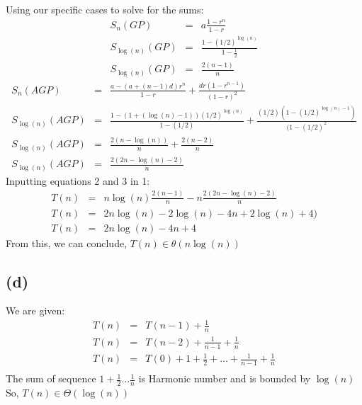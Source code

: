 \documentclass[a4paper,12pt]{article} %
\begin{document}
Using our specific cases to solve for the sums:
\begin{eqnarray}
    S_n(GP) &=& a\frac{1-r^n}{1-r}\nonumber \\
    S_{\log(n)}(GP) &=& \frac{1- (1/2)^{\log(n)}}{1-\frac{1}{2}} \nonumber \\
    S_{\log(n)}(GP) &=& \frac{2(n-1)}{n}
\end{eqnarray}
\begin{eqnarray}
    S_n(AGP) &=& \frac{a - (a + (n-1)d)r^n}{1-r} + \frac{dr(1 - r^{n-1})}{(1-r)^2}\nonumber \\
    S_{\log(n)}(AGP) &=& \frac{1 - (1 + (\log(n)-1))(1/2)^{\log(n)}}{1-(1/2)} + \frac{(1/2)(1 - (1/2)^{\log(n)-1})}{(1-(1/2)^2} \nonumber \\
    S_{\log(n)}(AGP) &=& \frac{2(n - \log(n))}{n} + \frac{2(n - 2)}{n} \nonumber \\
    S_{\log(n)}(AGP) &=& \frac{2(2n - \log(n) - 2)}{n}
\end{eqnarray}
Inputting equations 2 and 3 in 1:
\begin{eqnarray*}
    T(n) &=& n\log(n)\frac{2(n-1)}{n} - n\frac{2(2n - \log(n) - 2)}{n}\\
    T(n) &=& 2n\log(n) - 2\log(n) - 4n + 2\log(n) + 4)\\
    T(n) &=& 2n\log(n) - 4n + 4
\end{eqnarray*}
From this, we can conclude, $T(n) \in \theta(n\log(n))$


\subsection*{(d)}
We are given:
\begin{eqnarray*}
    T(n) &=& T(n-1) + \frac{1}{n}\\
    T(n) &=& T(n-2) + \frac{1}{n-1} + \frac{1}{n} \\
    T(n) &=& T(0)+1 + \frac{1}{2}+ \dots + \frac{1}{n-1} + \frac{1}{n} \\
\end{eqnarray*}
The sum of sequence $1 + \frac{1}{2} \dots \frac{1}{n}$ is Harmonic number and is bounded by $\log(n)$
So, $T(n) \in \Theta(\log(n))$
\end{document}

